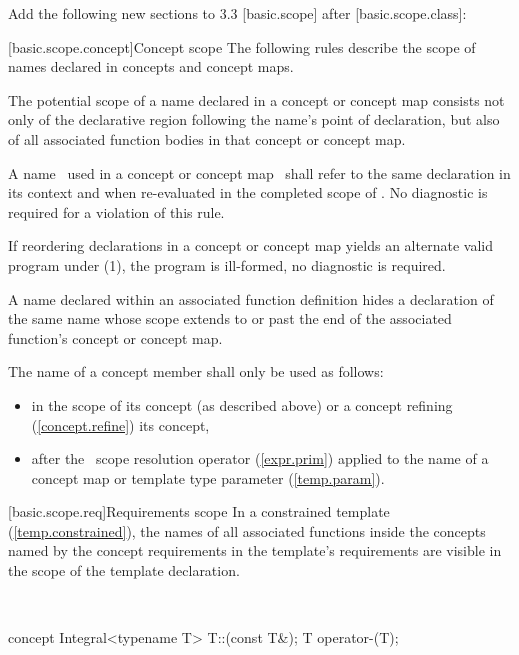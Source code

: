 \documentclass[american]{book}
\newcommand{\editorial}[1]{\colorbox{editbackground}{\begin{minipage}{\linewidth
}#1\end{minipage}}}
\begin{document}
\begin{paras}
\noindent\editorial{Add the following new sections to 3.3 [basic.scope] after [basic.scope.class]:}

\color{addclr}
\setcounter{subsection}{7}
[basic.scope.concept]{Concept scope}
\pnum
{}%
The following rules describe the scope of names declared in concepts
and concept maps.

\begin{enumeraten}
\item %
The potential scope of a name declared in a concept or concept map
consists not only of the declarative region
following the name's point of declaration,
but also of all associated function bodies
in that concept or concept map.
\item %
A name
\ 
used in a concept or concept map
\ 
shall refer to the same declaration in its context and when re-evaluated in
the completed scope of
\tcode{S}.
No diagnostic is required for a violation of this rule.
\item %
If reordering declarations in a concept or concept map yields an
alternate valid program under (1), the program is ill-formed,
no diagnostic is required.
\item %
A name declared within an associated function definition hides a declaration of the same name
whose scope extends to or past the end of the associated function's concept or
concept map.
\end{enumeraten}

\color{addclr}
\pnum
The name of a concept member shall only be used as follows:

\begin{itemize}
\item %
in the scope of its concept (as described above)
or a concept refining (\ref{concept.refine}) its concept,
\item %
after the
\tcode{::}\ 
scope resolution operator (\ref{expr.prim}) applied to the name of a
concept map or template type parameter (\ref{temp.param}).
\end{itemize}

\rSec2[basic.scope.req]{Requirements scope}
\pnum
In a constrained template (\mbox{\ref{temp.constrained}}),
the names of all associated functions inside the concepts named 
by the concept requirements in the template's requirements
are visible in the scope of the template
declaration. 

\enterexample\
\begin{codeblock}
concept Integral<typename T> {
  T::(const T&);
  T operator-(T);
}


\end{codeblock}
\end{paras}
\end{document}
